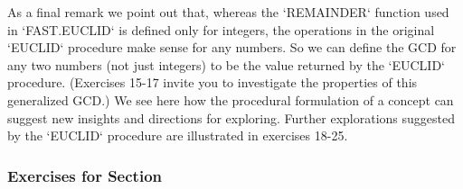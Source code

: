 \documentclass{book}
\begin{document}
As a final remark we point out that, whereas the \textsc{`REMAINDER`} function
used in \textsc{`FAST.EUCLID`} is defined only for integers, the operations in the
original \textsc{`EUCLID`} procedure make sense for any numbers. So we can define
the GCD for any two numbers (not just integers) to be the value returned
by the \textsc{`EUCLID`} procedure. (Exercises 15-17 invite you to investigate the
properties of this generalized GCD.) We see here how the procedural
formulation of a concept can suggest new insights and directions for
exploring. Further explorations suggested by the \textsc{`EUCLID`} procedure are
illustrated in exercises 18-25.

\subsubsection{Exercises for Section \thesection}
\end{document}
